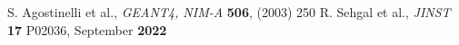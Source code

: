 \documentclass[twocolumn,amsmath,amssymb]{snp}
\begin{document}


\begin{thebibliography}{50}
 S. Agostinelli et al., \emph{GEANT4, NIM-A} {\bf 506}, (2003) 250
 R. Sehgal et al., \emph{JINST} {\bf 17} P02036,  September {\bf 2022}
\end{thebibliography}
\end{document}

